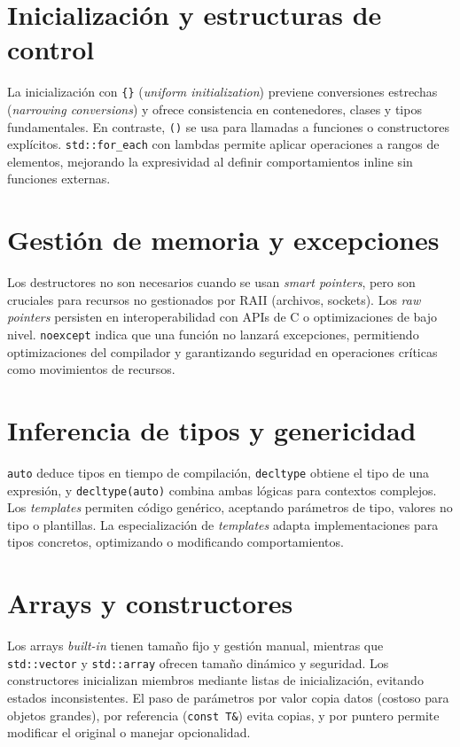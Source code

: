 \documentclass{article}
\begin{document}
\section{Inicializaci\'on y estructuras de control}
La inicializaci\'on con \texttt{\{\}} (\textit{uniform initialization}) previene conversiones estrechas (\textit{narrowing conversions}) y ofrece consistencia en contenedores, clases y tipos fundamentales. En contraste, \texttt{()} se usa para llamadas a funciones o constructores expl\'icitos. \texttt{std::for\_each} con lambdas permite aplicar operaciones a rangos de elementos, mejorando la expresividad al definir comportamientos inline sin funciones externas.

\section{Gesti\'on de memoria y excepciones}
Los destructores no son necesarios cuando se usan \textit{smart pointers}, pero son cruciales para recursos no gestionados por RAII (archivos, sockets). Los \textit{raw pointers} persisten en interoperabilidad con APIs de C o optimizaciones de bajo nivel. \texttt{noexcept} indica que una funci\'on no lanzar\'a excepciones, permitiendo optimizaciones del compilador y garantizando seguridad en operaciones cr\'iticas como movimientos de recursos.

\section{Inferencia de tipos y genericidad}
\texttt{auto} deduce tipos en tiempo de compilaci\'on, \texttt{decltype} obtiene el tipo de una expresi\'on, y \texttt{decltype(auto)} combina ambas l\'ogicas para contextos complejos. Los \textit{templates} permiten c\'odigo gen\'erico, aceptando par\'ametros de tipo, valores no tipo o plantillas. La especializaci\'on de \textit{templates} adapta implementaciones para tipos concretos, optimizando o modificando comportamientos.

\section{Arrays y constructores}
Los arrays \textit{built-in} tienen tama\~no fijo y gesti\'on manual, mientras que \texttt{std::vector} y \texttt{std::array} ofrecen tama\~no din\'amico y seguridad. Los constructores inicializan miembros mediante listas de inicializaci\'on, evitando estados inconsistentes. El paso de par\'ametros por valor copia datos (costoso para objetos grandes), por referencia (\texttt{const T\&}) evita copias, y por puntero permite modificar el original o manejar opcionalidad.
\end{document}
